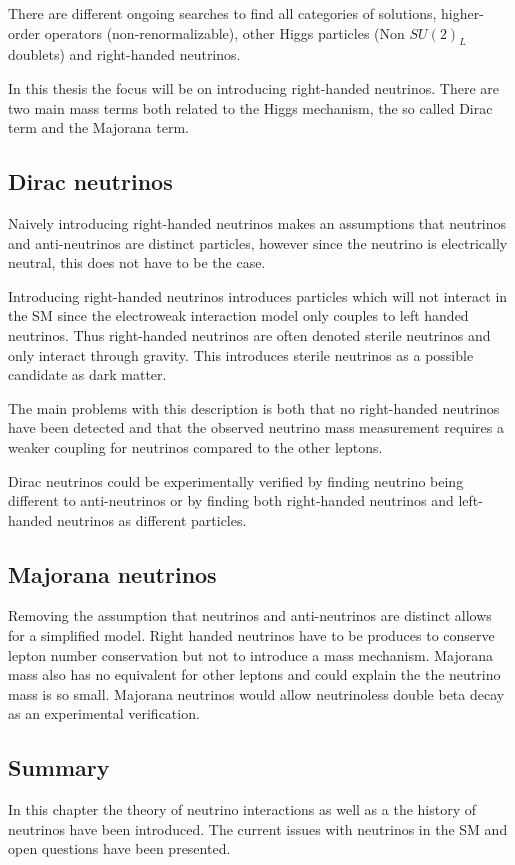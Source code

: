 There are different ongoing searches to find all categories of solutions, higher-order operators (non-renormalizable), other Higgs particles (Non $SU(2)_L $ doublets) and right-handed neutrinos.

In this thesis the focus will be on introducing right-handed neutrinos. There are two main mass terms both related to the Higgs mechanism, the so called Dirac term and the Majorana term.

\subsection{Dirac neutrinos}
Naively introducing right-handed neutrinos makes an assumptions that neutrinos and anti-neutrinos are distinct particles, however since the neutrino is electrically neutral, this does not have to be the case.
 
Introducing right-handed neutrinos introduces particles which will not interact in the SM since the electroweak interaction model only couples to left handed neutrinos. Thus right-handed neutrinos are often denoted sterile neutrinos and only interact through gravity. This introduces sterile neutrinos as a possible candidate as dark matter. \cite{SterileDark, SUSYdark}

The main problems with this description is both that no right-handed neutrinos have been detected and that the observed neutrino mass measurement requires a weaker coupling for neutrinos compared to the other leptons.

Dirac neutrinos could be experimentally verified by finding neutrino being different to anti-neutrinos or by finding both right-handed neutrinos and left-handed neutrinos as different particles.

\subsection{Majorana neutrinos}
Removing the assumption that neutrinos and anti-neutrinos are distinct allows for a simplified model. Right handed neutrinos have to be produces to conserve lepton number conservation but not to introduce a mass mechanism. Majorana mass also has no equivalent for other leptons and could explain the the neutrino mass is so small. Majorana neutrinos would allow neutrinoless double beta decay\cite{NeuLess} as an experimental verification.

\subsection{Summary}
In this chapter the theory of neutrino interactions as well as a the history of neutrinos have been introduced. The current issues with neutrinos in the SM and open questions have been presented.


%
